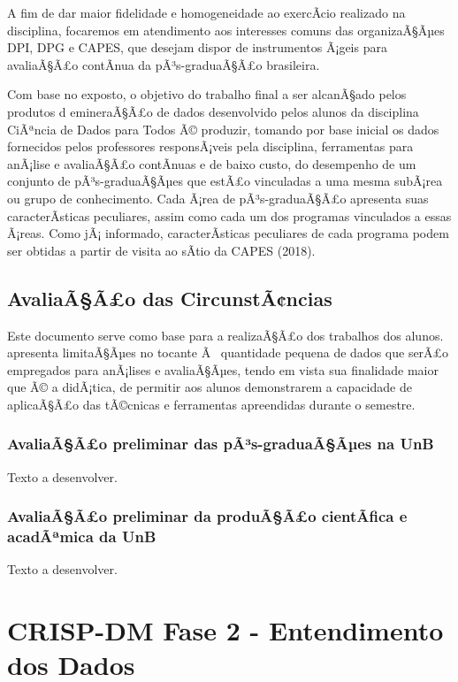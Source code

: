 \documentclass[]{article}
\begin{document}
A fim de dar maior fidelidade e homogeneidade ao exercÃ­cio realizado na
disciplina, focaremos em atendimento aos interesses comuns das
organizaÃ§Ãµes DPI, DPG e CAPES, que desejam dispor de instrumentos
Ã¡geis para avaliaÃ§Ã£o contÃ­nua da pÃ³s-graduaÃ§Ã£o brasileira.

Com base no exposto, o objetivo do trabalho final a ser alcanÃ§ado pelos
produtos d emineraÃ§Ã£o de dados desenvolvido pelos alunos da disciplina
CiÃªncia de Dados para Todos Ã© produzir, tomando por base inicial os
dados fornecidos pelos professores responsÃ¡veis pela disciplina,
ferramentas para anÃ¡lise e avaliaÃ§Ã£o contÃ­nuas e de baixo custo, do
desempenho de um conjunto de pÃ³s-graduaÃ§Ãµes que estÃ£o vinculadas a
uma mesma subÃ¡rea ou grupo de conhecimento. Cada Ã¡rea de
pÃ³s-graduaÃ§Ã£o apresenta suas caracterÃ­sticas peculiares, assim como
cada um dos programas vinculados a essas Ã¡reas. Como jÃ¡ informado,
caracterÃ­sticas peculiares de cada programa podem ser obtidas a partir
de visita ao sÃ­tio da CAPES (2018).

\subsection{AvaliaÃ§Ã£o das
CircunstÃ¢ncias}\label{avaliaaao-das-circunstancias}

Este documento serve como base para a realizaÃ§Ã£o dos trabalhos dos
alunos. apresenta limitaÃ§Ãµes no tocante Ã~ quantidade pequena de dados
que serÃ£o empregados para anÃ¡lises e avaliaÃ§Ãµes, tendo em vista sua
finalidade maior que Ã© a didÃ¡tica, de permitir aos alunos demonstrarem
a capacidade de aplicaÃ§Ã£o das tÃ©cnicas e ferramentas apreendidas
durante o semestre.

\subsubsection{AvaliaÃ§Ã£o preliminar das pÃ³s-graduaÃ§Ãµes na
UnB}\label{avaliaaao-preliminar-das-pas-graduaaaes-na-unb}

Texto a desenvolver.

\subsubsection{AvaliaÃ§Ã£o preliminar da produÃ§Ã£o cientÃ­fica e
acadÃªmica da
UnB}\label{avaliaaao-preliminar-da-produaao-cientafica-e-acadamica-da-unb}

Texto a desenvolver.

\section{CRISP-DM Fase 2 - Entendimento dos
Dados}\label{crisp-dm-fase-2---entendimento-dos-dados}
\end{document}
